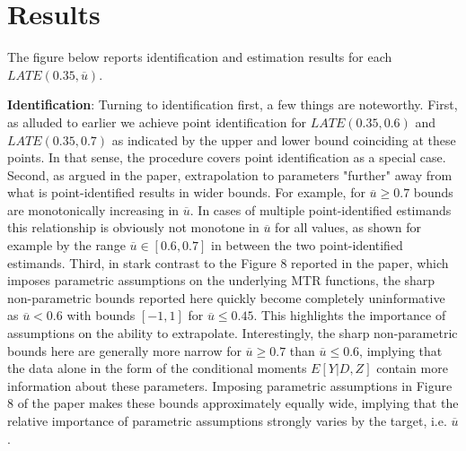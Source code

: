 \documentclass[11pt, a4paper, leqno]{article}
\begin{document}
\section{Results}
The figure below reports identification and estimation results for each $LATE(0.35, \overline{u})$.

\textbf{Identification}: Turning to identification first, a few things are noteworthy.
First, as alluded to earlier we achieve point identification for $LATE(0.35, 0.6)$ and $LATE(0.35, 0.7)$ as indicated by the upper and lower bound coinciding at these points.
In that sense, the procedure covers point identification as a special case.
Second, as argued in the paper, extrapolation to parameters "further" away from what is point-identified results in wider bounds.
For example, for $\overline{u}\geq0.7$ bounds are monotonically increasing in $\overline{u}$. In cases of multiple point-identified estimands this relationship is obviously not monotone in $\overline{u}$ for all values, as shown for example by the range $\overline{u}\in[0.6, 0.7]$ in between the two point-identified estimands.
Third, in stark contrast to the Figure 8 reported in the paper, which imposes parametric assumptions on the underlying MTR functions, the sharp non-parametric bounds reported here quickly become completely uninformative as $\overline{u}<0.6$ with bounds $[-1,1]$ for $\overline{u}\leq0.45$. This highlights the importance of assumptions on the ability to extrapolate.
Interestingly, the sharp non-parametric bounds here are generally more narrow for $\overline{u}\geq0.7$ than $\overline{u}\leq0.6$, implying that the data alone in the form of the conditional moments $E[Y|D,Z]$ contain more information about these parameters.
Imposing parametric assumptions in Figure 8 of the paper makes these bounds approximately equally wide, implying that the relative importance of parametric assumptions strongly varies by the target, i.e. $\overline{u}$.
\end{document}
